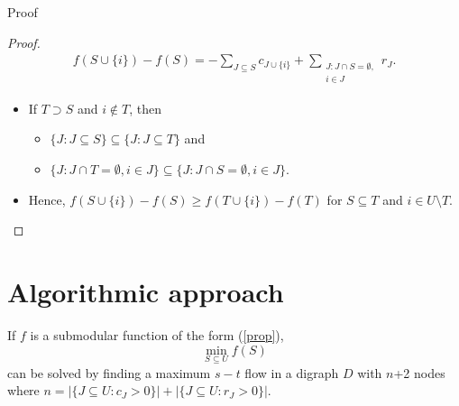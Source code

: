 \documentclass[usenames,dvipsnames]{beamer}
\begin{document}
\begin{frame}{Proof}
  \begin{proof}
    \begin{align*}
      f(S \cup \{i\}) - f(S) =
      -\sum\limits_{J \subseteq S} c_{J \cup \{i\}} + \sum\limits_{\substack{J: J \cap S = \emptyset,\\i \in J}} r_J.
    \end{align*}
    \begin{itemize}
    \item If $T \supset S$ and $i \not\in T$, then
      \begin{itemize}
      \item $\{J : J \subseteq S\} \subseteq \{J: J \subseteq T\}$ and
      \item $\{J: J \cap T = \emptyset,i\in J\} \subseteq \{J: J \cap S = \emptyset,i \in J\}$.
      \end{itemize}
      \item Hence, $f(S \cup \{i\}) - f(S) \geq f(T \cup \{i\}) -
        f(T)$ for $S \subseteq T$ and $i \in U \setminus T$.
    \end{itemize}
  \end{proof}
\end{frame}


\section{Algorithmic approach}
\begin{frame}
  \begin{theorem}
    If $f$ is a submodular function of the form
    (\ref{prop}), \[\min\limits_{S \subseteq U} f(S)\] can be solved
    by finding a maximum $s-t$ flow in a digraph $D$ with $n$+2 nodes
    where $n = |\{J \subseteq U: c_J > 0\}| + |\{J \subseteq U: r_J >
    0\}|$.
  \end{theorem}
\end{frame}
\end{document}
